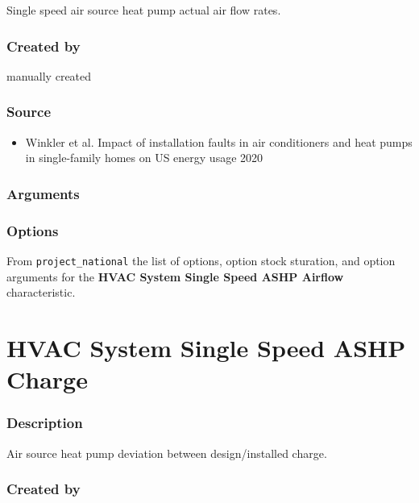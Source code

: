 Single speed air source heat pump actual air flow rates.

\subsubsection{Created by}\label{created-by-83}

manually created

\subsubsection{Source}\label{source-82}

\begin{itemize}
 
\item
  Winkler et al. \textquotesingle Impact of installation faults in air
  conditioners and heat pumps in single-family homes on US energy
  usage\textquotesingle{} 2020
\end{itemize}

\subsubsection{Arguments}\label{arguments-52}



\subsubsection{Options}\label{options-83}

From \texttt{project\_national} the list of options, option stock
sturation, and option arguments for the \textbf{HVAC System Single Speed
ASHP Airflow} characteristic.



\section{HVAC System Single Speed ASHP
Charge}\label{hvac_system_single_speed_ashp_charge}

\subsubsection{Description}\label{description-84}

Air source heat pump deviation between design/installed charge.

\subsubsection{Created by}\label{created-by-84}

